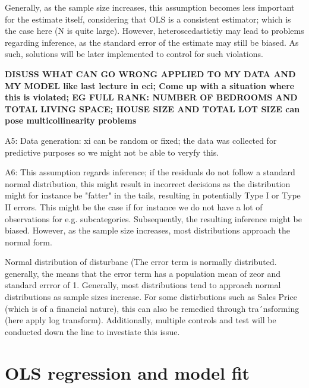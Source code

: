 \documentclass{article}
\begin{document}
Generally, as the sample size increases, this assumption becomes less important for the estimate itself, considering that OLS is a consistent estimator; which is the case here (N is quite large). However, heteroscedastictiy may lead to problems regarding inference, as the standard error of the estimate may still be biased. As such, solutions will be later implemented to control for such violations.

\textbf{DISUSS WHAT CAN GO WRONG APPLIED TO MY DATA AND MY MODEL like last lecture in eci; Come up with a situation where this is violated; EG FULL RANK: NUMBER OF BEDROOMS AND TOTAL LIVING SPACE; HOUSE SIZE AND TOTAL LOT SIZE can pose multicollinearity problems}

A5: Data generation: xi can be random or fixed; the data was collected for predictive purposes so we might not be able to veryfy this. 

A6: This assumption regards inference; if the residuals do not follow a standard normal distribution, this might result in incorrect decisions as the distribution might for instance be "fatter" in the tails, resulting in potentially Type I or Type II errors. This might be the case if for instance we do not have a lot of observations for e.g. subcategories. Subsequently, the resulting inference might be biased. However, as the sample size increases, most distributions approach the normal form. 




Normal distribution of disturbanc (The error term is normally distributed. generally, the means that the error term has a population mean of zeor and standard errror of 1. Generally, most distributions tend to approach normal distributions as sample sizes increase. For some distirbutions such as Sales Price (which is of a financial nature), this can also be remedied through tra´nsforming (here apply log transform). Additionally, multiple controls and test will be conducted down the line to investiate this issue.






\section{OLS regression and model fit}
\end{document}
